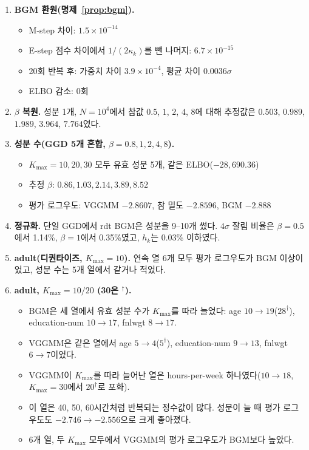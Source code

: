 \documentclass[11pt]{article}
\begin{document}
\begin{enumerate}
  \item \textbf{BGM 환원(명제~\ref{prop:bgm}).}
    \begin{itemize}
      \item M-step 차이: $1.5\times10^{-14}$
      \item E-step 점수 차이에서 $1/(2\kappa_k)$를 뺀 나머지: $6.7\times10^{-15}$
      \item 20회 반복 후: 가중치 차이 $3.9\times10^{-4}$, 평균 차이 $0.0036\sigma$
      \item ELBO 감소: 0회
    \end{itemize}
  \item \textbf{$\beta$ 복원.} 성분 1개, $N=10^4$에서 참값 $0.5$, $1$, $2$, $4$, $8$에 대해 추정값은 $0.503$, $0.989$, $1.989$, $3.964$, $7.764$였다.
  \item \textbf{성분 수(GGD 5개 혼합, $\beta=0.8,1,2,4,8$).}
    \begin{itemize}
      \item $K_{\max}=10,20,30$ 모두 유효 성분 5개, 같은 ELBO($-28{,}690.36$)
      \item 추정 $\beta$: $0.86,1.03,2.14,3.89,8.52$
      \item 평가 로그우도: VGGMM $-2.8607$, 참 밀도 $-2.8596$, BGM $-2.888$
    \end{itemize}
  \item \textbf{정규화.} 단일 GGD에서 rdt BGM은 성분을 9--10개 썼다. $4\sigma$ 잘림 비율은 $\beta=0.5$에서 1.14\%, $\beta=1$에서 0.35\%였고, $h_k$는 0.03\% 이하였다.
  \item \textbf{adult(디퀀타이즈, $K_{\max}=10$).} 연속 열 6개 모두 평가 로그우도가 BGM 이상이었고, 성분 수는 5개 열에서 같거나 적었다.
  \item \textbf{adult, $K_{\max}=10/20$ (30은 $^\dagger$).}
    \begin{itemize}
      \item BGM은 세 열에서 유효 성분 수가 $K_{\max}$를 따라 늘었다: age $10\to19$($28^\dagger$), education-num $10\to17$, fnlwgt $8\to17$.
      \item VGGMM은 같은 열에서 age $5\to4$($5^\dagger$), education-num $9\to13$, fnlwgt $6\to7$이었다.
      \item VGGMM이 $K_{\max}$를 따라 늘어난 열은 hours-per-week 하나였다($10\to18$, $K_{\max}=30$에서 $20^\dagger$로 포화).
      \item 이 열은 40, 50, 60시간처럼 반복되는 정수값이 많다. 성분이 늘 때 평가 로그우도도 $-2.746\to-2.556$으로 크게 좋아졌다.
      \item 6개 열, 두 $K_{\max}$ 모두에서 VGGMM의 평가 로그우도가 BGM보다 높았다.

\end{itemize}
\end{enumerate}
\end{document}
